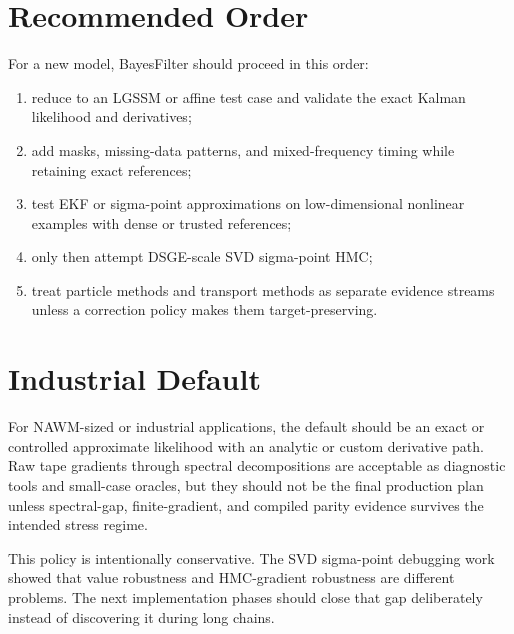 \section{Recommended Order}
\label{sec:bf-filter-choice-order}

For a new model, BayesFilter should proceed in this order:
\begin{enumerate}[label=(\roman*)]
  \item reduce to an LGSSM or affine test case and validate the exact Kalman
    likelihood and derivatives;
  \item add masks, missing-data patterns, and mixed-frequency timing while
    retaining exact references;
  \item test EKF or sigma-point approximations on low-dimensional nonlinear
    examples with dense or trusted references;
  \item only then attempt DSGE-scale SVD sigma-point HMC;
  \item treat particle methods and transport methods as separate evidence
    streams unless a correction policy makes them target-preserving.
\end{enumerate}

\section{Industrial Default}
\label{sec:bf-filter-choice-industrial-default}

For NAWM-sized or industrial applications, the default should be an exact or
controlled approximate likelihood with an analytic or custom derivative path.
Raw tape gradients through spectral decompositions are acceptable as
diagnostic tools and small-case oracles, but they should not be the final
production plan unless spectral-gap, finite-gradient, and compiled parity
evidence survives the intended stress regime.

This policy is intentionally conservative.  The SVD sigma-point debugging work
showed that value robustness and HMC-gradient robustness are different
problems.  The next implementation phases should close that gap deliberately
instead of discovering it during long chains.
